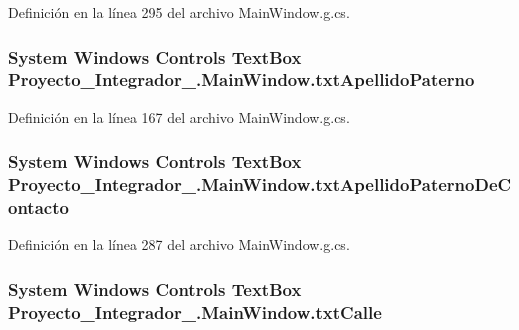 Definición en la línea 295 del archivo Main\-Window.\-g.\-cs.

\hypertarget{class_proyecto___integrador__3_1_1_main_window_a84bcf28ad1df8514c1b1646ab9a62513}{
\subsubsection[{txt\-Apellido\-Paterno}]{\setlength{\rightskip}{0pt plus 5cm}System Windows Controls Text\-Box Proyecto\-\_\-\-Integrador\-\_.\-Main\-Window.\-txt\-Apellido\-Paterno\hspace{0.3cm}{\ttfamily [package]}}}\label{class_proyecto___integrador__3_1_1_main_window_a84bcf28ad1df8514c1b1646ab9a62513}


Definición en la línea 167 del archivo Main\-Window.\-g.\-cs.

\hypertarget{class_proyecto___integrador__3_1_1_main_window_ad353fe2247d841495434638ca24cf97c}{
\subsubsection[{txt\-Apellido\-Paterno\-De\-Contacto}]{\setlength{\rightskip}{0pt plus 5cm}System Windows Controls Text\-Box Proyecto\-\_\-\-Integrador\-\_.\-Main\-Window.\-txt\-Apellido\-Paterno\-De\-Contacto\hspace{0.3cm}{\ttfamily [package]}}}\label{class_proyecto___integrador__3_1_1_main_window_ad353fe2247d841495434638ca24cf97c}


Definición en la línea 287 del archivo Main\-Window.\-g.\-cs.

\hypertarget{class_proyecto___integrador__3_1_1_main_window_afbbf986bc8047e3cade1e2ab50a1402c}{
\subsubsection[{txt\-Calle}]{\setlength{\rightskip}{0pt plus 5cm}System Windows Controls Text\-Box Proyecto\-\_\-\-Integrador\-\_.\-Main\-Window.\-txt\-Calle\hspace{0.3cm}{\ttfamily [package]}}}\label{class_proyecto___integrador__3_1_1_main_window_afbbf986bc8047e3cade1e2ab50a1402c}


